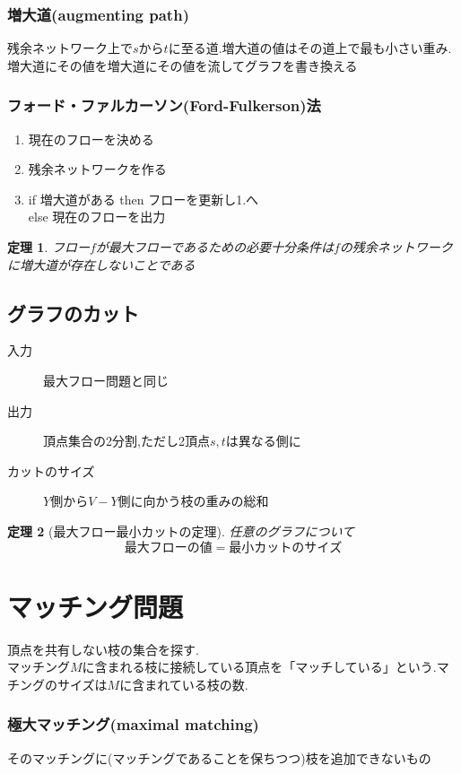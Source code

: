 \documentclass[a4j,10.5pt]{jarticle}
\theoremstyle{break}
\newtheorem{theo}{定理}[section]
\begin{document}
\subsubsection*{増大道(augmenting path)}
残余ネットワーク上で$s$から$t$に至る道.増大道の値はその道上で最も小さい重み.
増大道にその値を増大道にその値を流してグラフを書き換える
\subsubsection*{フォード・ファルカーソン(Ford-Fulkerson)法}
\begin{enumerate}
\item 現在のフローを決める
\item 残余ネットワークを作る
\item if 増大道がある then フローを更新し1.へ \\ else 現在のフローを出力
\end{enumerate}

\begin{theo}
フロー$f$が最大フローであるための必要十分条件は$f$の残余ネットワークに増大道が存在しないことである
\end{theo}

\subsection{グラフのカット}
\begin{description}
\item[入力] 最大フロー問題と同じ
\item[出力] 頂点集合の2分割,ただし2頂点$s,t$は異なる側に
\item[カットのサイズ] $Y$側から$V-Y$側に向かう枝の重みの総和
\end{description}

\begin{theo}[最大フロー最小カットの定理]
任意のグラフについて
\[最大フローの値 = 最小カットのサイズ\]
\end{theo}

\newpage

\section{マッチング問題}
頂点を共有しない枝の集合を探す.\\
マッチング$M$に含まれる枝に接続している頂点を「マッチしている」という.マチングのサイズは$M$に含まれている枝の数.

\subsubsection*{極大マッチング(maximal matching)}
そのマッチングに(マッチングであることを保ちつつ)枝を追加できないもの
\end{document}
